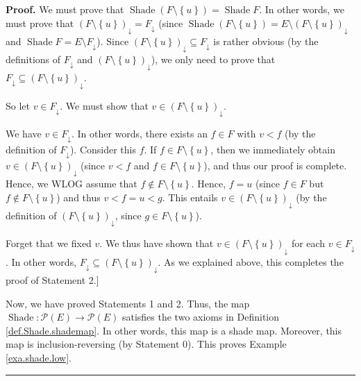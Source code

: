 \documentclass[numbers=enddot,12pt,final,onecolumn]{scrartcl}%
\theoremstyle{definition}
\newenvironment{proof}[1][Proof]{\noindent\textbf{#1.} }{\ \rule{0.5em}{0.5em}}
\newenvironment{verlong}{}{}
\begin{document}
\begin{verlong}
\begin{proof}
We must prove that $\operatorname*{Shade}\left(  F\setminus\left\{  u\right\}
\right)  =\operatorname*{Shade}F$. In other words, we must prove that $\left(
F\setminus\left\{  u\right\}  \right)  _{\downarrow}=F_{\downarrow}$ (since
$\operatorname*{Shade}\left(  F\setminus\left\{  u\right\}  \right)
=E\setminus\left(  F\setminus\left\{  u\right\}  \right)  _{\downarrow}$ and
$\operatorname*{Shade}F=E\setminus F_{\downarrow}$). Since $\left(
F\setminus\left\{  u\right\}  \right)  _{\downarrow}\subseteq F_{\downarrow}$
is rather obvious (by the definitions of $F_{\downarrow}$ and $\left(
F\setminus\left\{  u\right\}  \right)  _{\downarrow}$), we only need to prove
that $F_{\downarrow}\subseteq\left(  F\setminus\left\{  u\right\}  \right)
_{\downarrow}$.

So let $v\in F_{\downarrow}$. We must show that $v\in\left(  F\setminus
\left\{  u\right\}  \right)  _{\downarrow}$.

We have $v\in F_{\downarrow}$. In other words, there exists an $f\in F$ with
$v<f$ (by the definition of $F_{\downarrow}$). Consider this $f$. If $f\in
F\setminus\left\{  u\right\}  $, then we immediately obtain $v\in\left(
F\setminus\left\{  u\right\}  \right)  _{\downarrow}$ (since $v<f$ and $f\in
F\setminus\left\{  u\right\}  $), and thus our proof is complete. Hence, we
WLOG assume that $f\notin F\setminus\left\{  u\right\}  $. Hence, $f=u$ (since
$f\in F$ but $f\notin F\setminus\left\{  u\right\}  $) and thus $v<f=u<g$.
This entails $v\in\left(  F\setminus\left\{  u\right\}  \right)  _{\downarrow
}$ (by the definition of $\left(  F\setminus\left\{  u\right\}  \right)
_{\downarrow}$, since $g\in F\setminus\left\{  u\right\}  $).

Forget that we fixed $v$. We thus have shown that $v\in\left(  F\setminus
\left\{  u\right\}  \right)  _{\downarrow}$ for each $v\in F_{\downarrow}$. In
other words, $F_{\downarrow}\subseteq\left(  F\setminus\left\{  u\right\}
\right)  _{\downarrow}$. As we explained above, this completes the proof of
Statement 2.]

Now, we have proved Statements 1 and 2. Thus, the map $\operatorname*{Shade}%
:\mathcal{P}\left(  E\right)  \rightarrow\mathcal{P}\left(  E\right)  $
satisfies the two axioms in Definition \ref{def.Shade.shademap}. In other
words, this map is a shade map. Moreover, this map is inclusion-reversing (by
Statement 0). This proves Example \ref{exa.shade.low}.
\end{proof}
\end{verlong}
\end{document}
